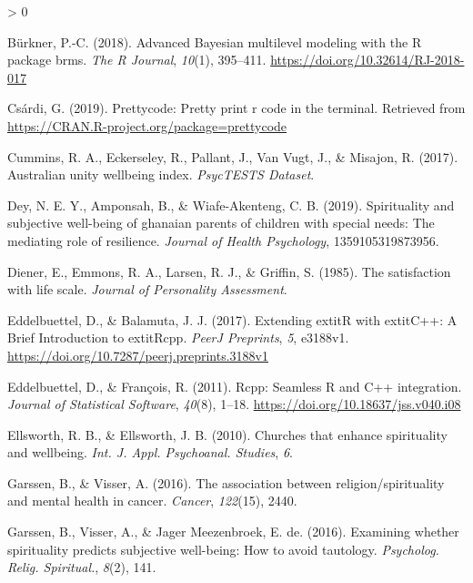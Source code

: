 \documentclass[
  english,
  man,floatsintext]{apa6}
\newlength{\cslhangindent}
\newenvironment{CSLReferences}[2] %
 {%
  \setlength{\parindent}{0pt}
  \ifodd #1 \everypar{\setlength{\hangindent}{\cslhangindent}}\ignorespaces\fi
  \ifnum #2 > 0
  \setlength{\parskip}{#2\baselineskip}
  \fi
 }%
 {}
\begin{document}
\begin{CSLReferences}{1}{0}
\leavevmode\hypertarget{ref-BRMSpackage}{}%
Bürkner, P.-C. (2018). Advanced {Bayesian} multilevel modeling with the {R} package {brms}. \emph{The R Journal}, \emph{10}(1), 395--411. \url{https://doi.org/10.32614/RJ-2018-017}

\leavevmode\hypertarget{ref-R-prettycode}{}%
Csárdi, G. (2019). Prettycode: Pretty print r code in the terminal. Retrieved from \url{https://CRAN.R-project.org/package=prettycode}

\leavevmode\hypertarget{ref-Cummins2017-ur}{}%
Cummins, R. A., Eckerseley, R., Pallant, J., Van Vugt, J., \& Misajon, R. (2017). Australian unity wellbeing index. \emph{PsycTESTS Dataset}.

\leavevmode\hypertarget{ref-dey2019spirituality}{}%
Dey, N. E. Y., Amponsah, B., \& Wiafe-Akenteng, C. B. (2019). Spirituality and subjective well-being of ghanaian parents of children with special needs: The mediating role of resilience. \emph{Journal of Health Psychology}, 1359105319873956.

\leavevmode\hypertarget{ref-Diener1985-xy}{}%
Diener, E., Emmons, R. A., Larsen, R. J., \& Griffin, S. (1985). The satisfaction with life scale. \emph{Journal of Personality Assessment}.

\leavevmode\hypertarget{ref-R-Rcpp_b}{}%
Eddelbuettel, D., \& Balamuta, J. J. (2017). {Extending extit{R} with extit{C++}: A Brief Introduction to extit{Rcpp}}. \emph{PeerJ Preprints}, \emph{5}, e3188v1. \url{https://doi.org/10.7287/peerj.preprints.3188v1}

\leavevmode\hypertarget{ref-R-Rcpp_a}{}%
Eddelbuettel, D., \& François, R. (2011). {Rcpp}: Seamless {R} and {C++} integration. \emph{Journal of Statistical Software}, \emph{40}(8), 1--18. \url{https://doi.org/10.18637/jss.v040.i08}

\leavevmode\hypertarget{ref-Ellsworth2010-yu}{}%
Ellsworth, R. B., \& Ellsworth, J. B. (2010). Churches that enhance spirituality and wellbeing. \emph{Int. J. Appl. Psychoanal. Studies}, \emph{6}.

\leavevmode\hypertarget{ref-Garssen2016-km}{}%
Garssen, B., \& Visser, A. (2016). The association between religion/spirituality and mental health in cancer. \emph{Cancer}, \emph{122}(15), 2440.

\leavevmode\hypertarget{ref-Garssen2016-kb}{}%
Garssen, B., Visser, A., \& Jager Meezenbroek, E. de. (2016). Examining whether spirituality predicts subjective well-being: How to avoid tautology. \emph{Psycholog. Relig. Spiritual.}, \emph{8}(2), 141.


\end{CSLReferences}
\end{document}
